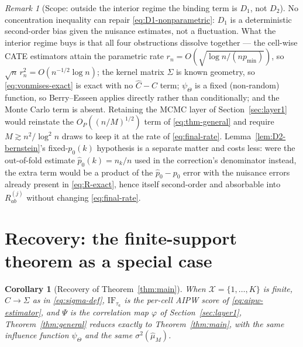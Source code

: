\documentclass[11pt]{article}
\theoremstyle{plain}
\newtheorem{corollary}[theorem]{Corollary}
\theoremstyle{definition}
\theoremstyle{remark}
\newtheorem{remark}[theorem]{Remark}
\newcommand{\cX}{\mathcal{X}}
\newcommand{\Qhat}{\widehat{\mu}_M}
\newcommand{\IF}{\mathrm{IF}}
\begin{document}
\begin{remark}[Scope: outside the interior regime the binding term is $D_1$, not
$D_2$]
No concentration inequality can repair \eqref{eq:D1-nonparametric}: $D_1$ is a
deterministic second-order bias given the nuisance estimates, not a fluctuation. What the
interior regime buys is that all four obstructions dissolve together --- the cell-wise
CATE estimators attain the parametric rate $r_n=O(\sqrt{\log n/(np_{\min})})$, so
$\sqrt n\,r_n^2=O(n^{-1/2}\log n)$; the kernel matrix $\Sigma$ is known geometry, so
\eqref{eq:vonmises-exact} is exact with no $\hat C-C$ term; $\psi_\Theta$ is a fixed
(non-random) function, so Berry--Esseen applies directly rather than conditionally; and
the Monte Carlo term is absent. Retaining the MCMC layer of Section~\ref{sec:layer1}
would reinstate the $O_P((n/M)^{1/2})$ term of \eqref{eq:thm-general} and require
$M\gtrsim n^2/\log^2n$ draws to keep it at the rate of \eqref{eq:final-rate}.
Lemma~\ref{lem:D2-bernstein}'s fixed-$p_0(k)$ hypothesis is a separate matter and costs
less: were the out-of-fold estimate $\hat p_0(k)=n_k/n$ used in the correction's
denominator instead, the extra term would be a product of the $\hat p_0-p_0$ error with
the nuisance errors already present in \eqref{eq:R-exact}, hence itself second-order and
absorbable into $R^{(j)}_{ab}$ without changing \eqref{eq:final-rate}.
\end{remark}

\section{Recovery: the finite-support theorem as a special case}\label{sec:recovery}

\begin{corollary}[Recovery of Theorem~\ref{thm:main}]\label{cor:recovery}
When $\cX=\{1,\dots,K\}$ is finite, $C\to\Sigma$ as in \eqref{eq:sigma-def},
$\IF_{\tau_a}$ is the per-cell AIPW score of \eqref{eq:aipw-estimator}, and $\Psi$ is
the correlation map $\varphi$ of Section~\ref{sec:layer1}, Theorem~\ref{thm:general}
reduces exactly to Theorem~\ref{thm:main}, with the same influence function
$\psi_\Theta$ and the same $\sigma^2(\Qhat)$.
\end{corollary}
\end{document}
